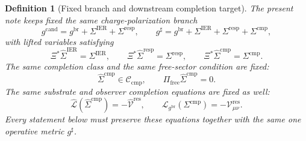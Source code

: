 \documentclass[11pt]{article}
\newcommand{\ObserverMap}{\Xi}
\newcommand{\ObserverMetric}{g^{\mathrm{br}}}
\newcommand{\CandidateMetric}{g^{\mathrm{cand}}}
\newcommand{\CompletedMetric}{g^{\sharp}}
\newcommand{\BaseShift}{\Sigma^{\mathrm{IER}}}
\newcommand{\ResponseShift}{\Sigma^{\mathrm{resp}}}
\newcommand{\CompShift}{\Sigma^{\mathrm{cmp}}}
\newcommand{\BaseLift}{\widehat\Sigma^{\mathrm{IER}}}
\newcommand{\ResponseLift}{\widehat\Sigma^{\mathrm{resp}}}
\newcommand{\CompLift}{\widehat\Sigma^{\mathrm{cmp}}}
\newcommand{\ResidualCore}{\mathcal V_{\mu\nu}^{\mathrm{res}}}
\newcommand{\ResidualLift}{\widehat{\mathcal V}^{\mathrm{res}}}
\newcommand{\SubReducedEin}{\widehat{\mathcal L}}
\newcommand{\FreeProj}{\Pi_{\mathrm{free}}}
\newcommand{\ReducedEin}{\mathcal L_{\ObserverMetric}}
\newcommand{\CompClass}{\mathscr C_{\mathrm{cmp}}}
\newtheorem{definition}{Definition}
\begin{document}
\begin{definition}[Fixed branch and downstream completion target]
\label{def:fixed_branch}
The present note keeps fixed the same charge-polarization branch
\begin{equation}
\CandidateMetric
=
\ObserverMetric+\BaseShift+\ResponseShift,
\qquad
\CompletedMetric
=
\ObserverMetric+\BaseShift+\ResponseShift+\CompShift,
\label{eq:fixed_metrics}
\end{equation}
with lifted variables satisfying
\begin{equation}
\ObserverMap^*\BaseLift=\BaseShift,
\qquad
\ObserverMap^*\ResponseLift=\ResponseShift,
\qquad
\ObserverMap^*\CompLift=\CompShift.
\label{eq:fixed_lifts}
\end{equation}
The same completion class and the same free-sector condition are fixed:
\begin{equation}
\CompLift\in\CompClass,
\qquad
\FreeProj\CompLift=0.
\label{eq:fixed_free}
\end{equation}
The same substrate and observer completion equations are fixed as well:
\begin{equation}
\SubReducedEin(\CompLift)=-\ResidualLift,
\qquad
\ReducedEin(\CompShift)=-\ResidualCore.
\label{eq:fixed_solves}
\end{equation}
Every statement below must preserve these equations together with the same one operative metric \(\CompletedMetric\).
\end{definition}
\end{document}
